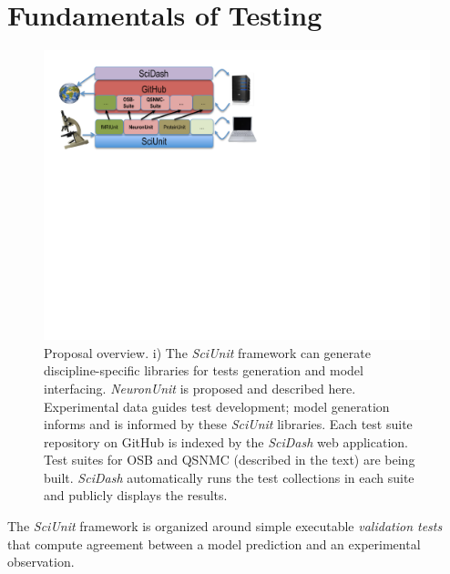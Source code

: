 \documentclass[11pt,letterpaper]{article}
\begin{document}
\section{Fundamentals of Testing}
\vspace{-12px}
\begin{figure}
\vspace{-38px}
\includegraphics[scale=0.75]{sciunit_overview.pdf}
\caption{Proposal overview. 
\small{i) The \textit{SciUnit} framework can generate discipline-specific libraries for tests generation and model interfacing.  
\textit{NeuronUnit} is proposed and described here.  Experimental data guides test development; model generation informs and is informed by these \textit{SciUnit} libraries.  
Each  test suite repository on GitHub is indexed by the \textit{SciDash} web application.  
Test suites for OSB and QSNMC (described in the text) are being built. 
\textit{SciDash} automatically runs the test collections in each suite and publicly displays the results.}}
\vspace{-10px}
\label{fig:sciunit_overview}
\end{figure}
\leavevmode
\vspace{-0px}

The \textit{SciUnit} framework is organized around simple executable \emph{validation tests} that compute agreement between a model prediction and an experimental observation. 
\end{document}
